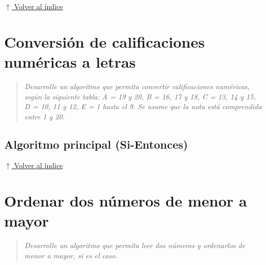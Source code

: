 \documentclass[12pt]{article}
\newcommand{\pseudocodigo}[2]{%
}
\newcommand{\volverindice}{%
    \vspace{1em}%
    \begin{flushright}%
        \hyperlink{indice}{\small $\uparrow$ Volver al índice}%
    \end{flushright}%
}
\newcommand{\enunciado}[1]{%
    \begin{quote}
        \itshape #1
    \end{quote}
}
\begin{document}

\volverindice
\newpage


\section{Conversión de calificaciones numéricas a letras}

\enunciado{Desarrolle un algoritmo que permita convertir calificaciones numéricas, según la siguiente tabla: A = 19 y 20, B = 16, 17 y 18, C = 13, 14 y 15, D = 10, 11 y 12, E = 1 hasta el 9. Se asume que la nota está comprendida entre 1 y 20.}

\subsection{Algoritmo principal (Si-Entonces)}

\pseudocodigo{ej07_calificaciones}{Conversión de calificaciones con Si-Entonces}






\volverindice
\newpage


\section{Ordenar dos números de menor a mayor}

\enunciado{Desarrolle un algoritmo que permita leer dos números y ordenarlos de menor a mayor, si es el caso.}
\end{document}
